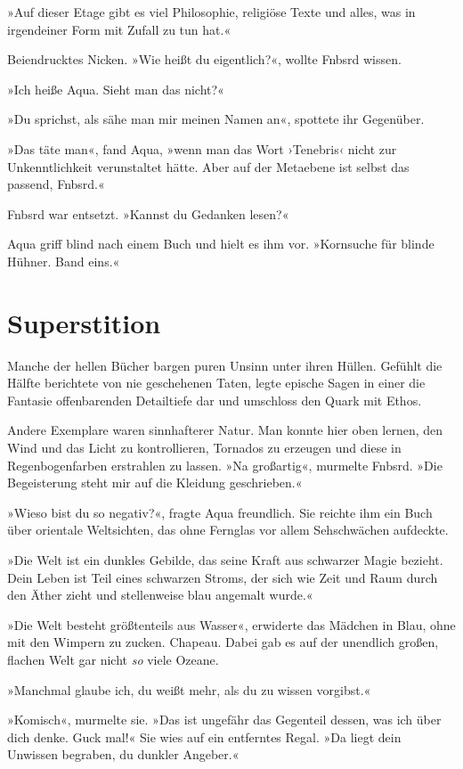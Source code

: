 »Auf dieser Etage gibt es viel Philosophie, religiöse Texte und alles, was in irgendeiner Form mit Zufall zu tun hat.«

Beiendrucktes Nicken. »Wie heißt du eigentlich?«, wollte Fnbsrd wissen.

»Ich heiße Aqua. Sieht man das nicht?«

»Du sprichst, als sähe man mir meinen Namen an«, spottete ihr Gegenüber.

»Das täte man«, fand Aqua, »wenn man das Wort ›Tenebris‹ nicht zur Unkenntlichkeit verunstaltet hätte. Aber auf der Metaebene ist selbst das passend, Fnbsrd.«

Fnbsrd war entsetzt. »Kannst du Gedanken lesen?«

Aqua griff blind nach einem Buch und hielt es ihm vor. »Kornsuche für blinde Hühner. Band eins.«


\chapter{Superstition}

Manche der hellen Bücher bargen puren Unsinn unter ihren Hüllen. Gefühlt die Hälfte berichtete von nie geschehenen Taten, legte epische Sagen in einer die Fantasie offenbarenden Detailtiefe dar und umschloss den Quark mit Ethos.

Andere Exemplare waren sinnhafterer Natur. Man konnte hier oben lernen, den Wind und das Licht zu kontrollieren, Tornados zu erzeugen und diese in Regenbogenfarben erstrahlen zu lassen. »Na großartig«, murmelte Fnbsrd. »Die Begeisterung steht mir auf die Kleidung geschrieben.«

»Wieso bist du so negativ?«, fragte Aqua freundlich. Sie reichte ihm ein Buch über orientale Weltsichten, das ohne Fernglas vor allem Sehschwächen aufdeckte.

»Die Welt ist ein dunkles Gebilde, das seine Kraft aus schwarzer Magie bezieht. Dein Leben ist Teil eines schwarzen Stroms, der sich wie Zeit und Raum durch den Äther zieht und stellenweise blau angemalt wurde.«

»Die Welt besteht größtenteils aus Wasser«, erwiderte das Mädchen in Blau, ohne mit den Wimpern zu zucken. Chapeau. Dabei gab es auf der unendlich großen, flachen Welt gar nicht \emph{so} viele Ozeane.

»Manchmal glaube ich, du weißt mehr, als du zu wissen vorgibst.«

»Komisch«, murmelte sie. »Das ist ungefähr das Gegenteil dessen, was ich über dich denke. Guck mal!« Sie wies auf ein entferntes Regal. »Da liegt dein Unwissen begraben, du dunkler Angeber.«

